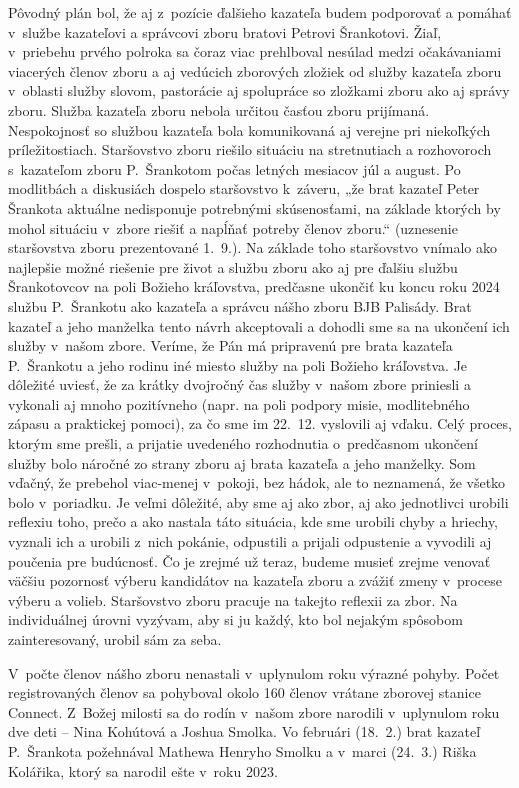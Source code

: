 Pôvodný plán bol, že aj z~pozície ďalšieho kazateľa budem podporovať a pomáhať v~službe kazateľovi a správcovi zboru bratovi Petrovi Šrankotovi. Žiaľ, v~priebehu prvého polroka sa čoraz viac prehlboval nesúlad medzi očakávaniami viacerých členov zboru a aj vedúcich zborových zložiek od služby kazateľa zboru v~oblasti služby slovom, pastorácie aj spolupráce so zložkami zboru ako aj správy zboru. Služba kazateľa zboru nebola určitou časťou zboru prijímaná. Nespokojnosť so službou kazateľa bola komunikovaná aj verejne pri niekoľkých príležitostiach. Staršovstvo zboru riešilo situáciu na stretnutiach a rozhovoroch s~kazateľom zboru P.~Šrankotom počas letných mesiacov júl a august.
Po modlitbách a diskusiách dospelo staršovstvo k~záveru, „že brat kazateľ Peter Šrankota aktuálne nedisponuje potrebnými skúsenosťami, na základe ktorých by mohol situáciu v~zbore riešiť a napĺňať potreby členov zboru.“ (uznesenie staršovstva zboru prezentované 1.~9.). Na základe toho staršovstvo vnímalo ako najlepšie možné riešenie pre život a službu zboru ako aj pre ďalšiu službu Šrankotovcov na poli Božieho kráľovstva, predčasne ukončiť ku koncu roku 2024 službu P.~Šrankotu ako kazateľa a správcu nášho zboru BJB Palisády. Brat kazateľ a jeho manželka tento návrh akceptovali a dohodli sme sa na ukončení ich služby v~našom zbore. Veríme, že Pán má pripravenú pre brata kazateľa P.~Šrankotu a jeho rodinu iné miesto služby na poli Božieho kráľovstva. Je dôležité uviesť, že za krátky dvojročný čas služby v~našom zbore priniesli a vykonali aj mnoho pozitívneho (napr. na poli podpory misie, modlitebného zápasu a praktickej pomoci), za čo sme im 22.~12. vyslovili aj vďaku. Celý proces, ktorým sme prešli, a prijatie uvedeného rozhodnutia o~predčasnom ukončení služby bolo náročné zo strany zboru aj brata kazateľa a jeho manželky. Som vďačný, že prebehol viac-menej v~pokoji, bez hádok, ale to neznamená, že všetko bolo v~poriadku. Je veľmi dôležité, aby sme aj ako zbor, aj ako jednotlivci urobili reflexiu toho, prečo a ako nastala táto situácia, kde sme urobili chyby a hriechy, vyznali ich a urobili z~nich pokánie, odpustili a prijali odpustenie a vyvodili aj poučenia pre budúcnosť. Čo je zrejmé už teraz, budeme musieť zrejme venovať väčšiu pozornosť výberu kandidátov na kazateľa zboru a zvážiť zmeny v~procese výberu a volieb. Staršovstvo zboru pracuje na takejto reflexii za zbor. Na individuálnej úrovni vyzývam, aby si ju každý, kto bol nejakým spôsobom zainteresovaný, urobil sám za seba.


V~počte členov nášho zboru nenastali v~uplynulom roku výrazné pohyby.
Počet registrovaných členov sa pohyboval okolo 160 členov vrátane zborovej stanice Connect.
Z~Božej milosti sa do rodín v~našom zbore narodili v~uplynulom roku dve deti -- Nina Kohútová a Joshua Smolka. Vo februári (18.~2.) brat kazateľ P.~Šrankota požehnával Mathewa Henryho Smolku a v~marci (24.~3.) Riška Kolářika, ktorý sa narodil ešte v~roku 2023.

